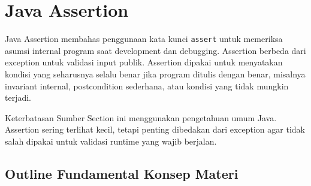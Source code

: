 \section{Java Assertion}

Java Assertion membahas penggunaan kata kunci \texttt{assert} untuk memeriksa asumsi internal program saat development dan debugging. Assertion berbeda dari exception untuk validasi input publik. Assertion dipakai untuk menyatakan kondisi yang seharusnya selalu benar jika program ditulis dengan benar, misalnya invariant internal, postcondition sederhana, atau kondisi yang tidak mungkin terjadi.

\begin{cmt}{Keterbatasan Sumber}{}
Section ini menggunakan pengetahuan umum Java. Assertion sering terlihat kecil, tetapi penting dibedakan dari exception agar tidak salah dipakai untuk validasi runtime yang wajib berjalan.
\end{cmt}

\subsection{Outline Fundamental Konsep Materi}

